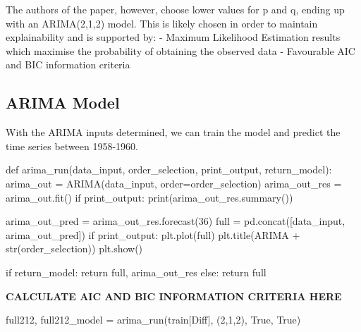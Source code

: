 \documentclass[
  letterpaper,
  DIV=11,
  numbers=noendperiod]{scrartcl}
\newenvironment{Shaded}{\begin{snugshade}}{\end{snugshade}}
\newcommand{\BuiltInTok}[1]{\textcolor[rgb]{0.00,0.23,0.31}{#1}}
\newcommand{\ControlFlowTok}[1]{\textcolor[rgb]{0.00,0.23,0.31}{#1}}
\newcommand{\DecValTok}[1]{\textcolor[rgb]{0.68,0.00,0.00}{#1}}
\newcommand{\KeywordTok}[1]{\textcolor[rgb]{0.00,0.23,0.31}{#1}}
\newcommand{\NormalTok}[1]{\textcolor[rgb]{0.00,0.23,0.31}{#1}}
\newcommand{\OperatorTok}[1]{\textcolor[rgb]{0.37,0.37,0.37}{#1}}
\newcommand{\StringTok}[1]{\textcolor[rgb]{0.13,0.47,0.30}{#1}}
\newcommand{\VariableTok}[1]{\textcolor[rgb]{0.07,0.07,0.07}{#1}}
\begin{document}
The authors of the paper, however, choose lower values for p and q,
ending up with an ARIMA(2,1,2) model. This is likely chosen in order to
maintain explainability and is supported by: - Maximum Likelihood
Estimation results which maximise the probability of obtaining the
observed data - Favourable AIC and BIC information criteria

\hypertarget{arima-model}{%
\subsection{ARIMA Model}\label{arima-model}}

With the ARIMA inputs determined, we can train the model and predict the
time series between 1958-1960.

\begin{Shaded}
\begin{Highlighting}[]
\KeywordTok{def}\NormalTok{ arima\_run(data\_input, order\_selection, print\_output, return\_model):}
\NormalTok{    arima\_out }\OperatorTok{=}\NormalTok{ ARIMA(data\_input, order}\OperatorTok{=}\NormalTok{order\_selection)}
\NormalTok{    arima\_out\_res }\OperatorTok{=}\NormalTok{ arima\_out.fit()}
    \ControlFlowTok{if}\NormalTok{ print\_output:}
        \BuiltInTok{print}\NormalTok{(arima\_out\_res.summary())}
        
\NormalTok{    arima\_out\_pred }\OperatorTok{=}\NormalTok{ arima\_out\_res.forecast(}\DecValTok{36}\NormalTok{)}
\NormalTok{    full }\OperatorTok{=}\NormalTok{ pd.concat([data\_input, arima\_out\_pred])    }
    \ControlFlowTok{if}\NormalTok{ print\_output:}
\NormalTok{        plt.plot(full)}
\NormalTok{        plt.title(}\StringTok{\textquotesingle{}ARIMA \textquotesingle{}} \OperatorTok{+} \BuiltInTok{str}\NormalTok{(order\_selection))}
\NormalTok{        plt.show()}
    
    \ControlFlowTok{if}\NormalTok{ return\_model:}
        \ControlFlowTok{return}\NormalTok{ full, arima\_out\_res}
    \ControlFlowTok{else}\NormalTok{:}
        \ControlFlowTok{return}\NormalTok{ full}
\end{Highlighting}
\end{Shaded}

\textbf{CALCULATE AIC AND BIC INFORMATION CRITERIA HERE}

\begin{Shaded}
\begin{Highlighting}[]
\NormalTok{full212, full212\_model }\OperatorTok{=}\NormalTok{ arima\_run(train[}\StringTok{\textquotesingle{}Diff\textquotesingle{}}\NormalTok{], (}\DecValTok{2}\NormalTok{,}\DecValTok{1}\NormalTok{,}\DecValTok{2}\NormalTok{), }\VariableTok{True}\NormalTok{, }\VariableTok{True}\NormalTok{)}
\end{Highlighting}
\end{Shaded}
\end{document}
